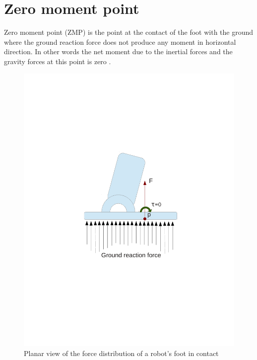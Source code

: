 \section{Zero moment point}
\label{sec:zmp}
Zero moment point (ZMP) is the point at the contact of the foot with the ground where the ground reaction force does not produce any moment in horizontal direction. In other words the net moment due to the inertial forces and the gravity forces at this point is zero \citep{mio04}.
\begin{figure}[h]
	\centering
	\includegraphics[trim=30mm 75mm 30mm 70mm,clip,scale=0.65]{Bilder/zmp.pdf}
	\caption{Planar view of the force distribution of a robot's foot in contact}
	\label{fig:zmp_plane}
\end{figure}

